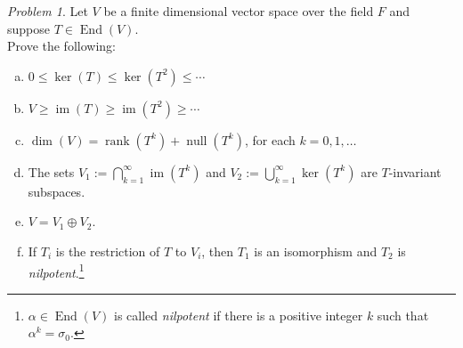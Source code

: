 \documentclass[11pt]{paper}
\theoremstyle{remark}
\newtheorem{problem}{Problem}
\newcommand{\<}{\ensuremath{\langle}}
\renewcommand{\>}{\ensuremath{\rangle}}
\newcommand\End{\ensuremath{\operatorname{End}}}
\newcommand{\nulity}[1]{\ensuremath{\operatorname{null}(#1)}}
\renewcommand{\ker}[1]{\ensuremath{\operatorname{ker}(#1)}}
\renewcommand{\dim}[1]{\ensuremath{\operatorname{dim}(#1)}}
\newcommand\im[1]{\ensuremath{\operatorname{im}(#1)}}
\newcommand{\rank}[1]{\ensuremath{\operatorname{rank}(#1)}}
\renewcommand{\leq}{\ensuremath{\leqslant}}
\renewcommand{\geq}{\ensuremath{\geqslant}}
\begin{document}
\begin{problem}
\item Let $V$ be a finite dimensional vector space over the field $F$ and 
suppose $T \in \End(V)$.\\
Prove the following:
  \begin{enumerate}[(a)]
  \item
$0 \leq \ker{T} \leq \ker{T^2} \leq \cdots$
\item
$V \geq \im{T} \geq \im{T^2} \geq \cdots$
\item $\dim{V} = \rank{T^k} + \nulity{T^k}$, for each $k= 0, 1, \dots$
\item The sets
    $V_1 := \bigcap\limits_{k=1}^\infty \im{T^k}$ and
    $V_2 := \bigcup\limits_{k=1}^\infty \ker{T^k}$ are $T$-invariant subspaces.
  \item $V = V_1 \oplus V_2$.
  \item If $T_i$ is the restriction of $T$ to $V_i$, then 
    $T_1$ is an isomorphism and $T_2$ is
    \emph{nilpotent}.\footnote{$\alpha\in \End(V)$ is called \emph{nilpotent} if
      there is a positive integer $k$ such that $\alpha^k = \sigma_0$.} 
  \end{enumerate}
\end{problem}

\probskip
\end{document}

